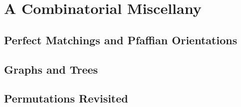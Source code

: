 
\chapter{A Combinatorial Miscellany}





\section{Perfect Matchings and Pfaffian Orientations}

\section{Graphs and Trees}

\section{Permutations Revisited}








\endinput
